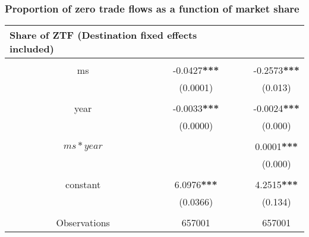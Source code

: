 \documentclass{beamer}
\begin{document}
\begin{frame}[plain]\frametitle{Proportion of zero trade flows as a function of market share}
\begin{table}[H]
\begin{tabular}{lccc}
\multicolumn{3}{l}{Share of ZTF \if 0 (Destination fixed effects included)\fi } \\
\hline
 &  &  & \\
 & ms & -0.0427\textbf{***} & -0.2573\textbf{***} \\
 &  &  (0.0001) & (0.013) \\
\vspace{2pt} \\
 & year & -0.0033\textbf{***} & -0.0024\textbf{***} \\
 &  &  (0.0000) & (0.000) \\
\vspace{2pt} \\
 & $ms*year$ & & 0.0001\textbf{***} \\
 &   &  & (0.000) \\
\vspace{2pt} \\
 & constant & 6.0976\textbf{***} & 4.2515\textbf{***} \\
 &  & (0.0366) & (0.134) \\
 &  &  &\\
\hline
 & Observations & 657001 & 657001 \\ 
\end{tabular}
\end{table}
\end{frame}
\end{document}
